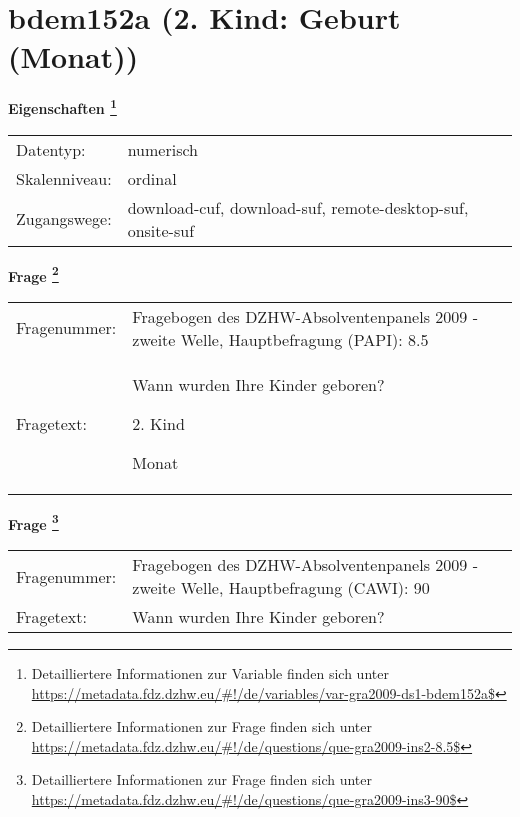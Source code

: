
    \setcounter{footnote}{0}

    \vspace*{-1.8cm}
	\section{bdem152a (2. Kind: Geburt (Monat))}
	\label{section:bdem152a}



    \vspace*{0.5cm}
    \noindent\textbf{Eigenschaften
	\footnote{Detailliertere Informationen zur Variable finden sich unter
		\url{https://metadata.fdz.dzhw.eu/\#!/de/variables/var-gra2009-ds1-bdem152a$}}}\\
	\begin{tabularx}{\hsize}{@{}lX}
	Datentyp: & numerisch \\
	Skalenniveau: & ordinal \\
	Zugangswege: &
	  download-cuf, 
	  download-suf, 
	  remote-desktop-suf, 
	  onsite-suf
 \\
    \end{tabularx}



				\vspace*{0.5cm}
                \noindent\textbf{Frage
	                \footnote{Detailliertere Informationen zur Frage finden sich unter
		              \url{https://metadata.fdz.dzhw.eu/\#!/de/questions/que-gra2009-ins2-8.5$}}}\\
				\begin{tabularx}{\hsize}{@{}lX}
					Fragenummer: &
					  Fragebogen des DZHW-Absolventenpanels 2009 - zweite Welle, Hauptbefragung (PAPI):
					  8.5
 \\
					Fragetext: & Wann wurden Ihre Kinder geboren?\par  2. Kind\par  Monat \\
				\end{tabularx}
				\vspace*{0.5cm}
                \noindent\textbf{Frage
	                \footnote{Detailliertere Informationen zur Frage finden sich unter
		              \url{https://metadata.fdz.dzhw.eu/\#!/de/questions/que-gra2009-ins3-90$}}}\\
				\begin{tabularx}{\hsize}{@{}lX}
					Fragenummer: &
					  Fragebogen des DZHW-Absolventenpanels 2009 - zweite Welle, Hauptbefragung (CAWI):
					  90
 \\
					Fragetext: & Wann wurden Ihre Kinder geboren? \\
				\end{tabularx}






